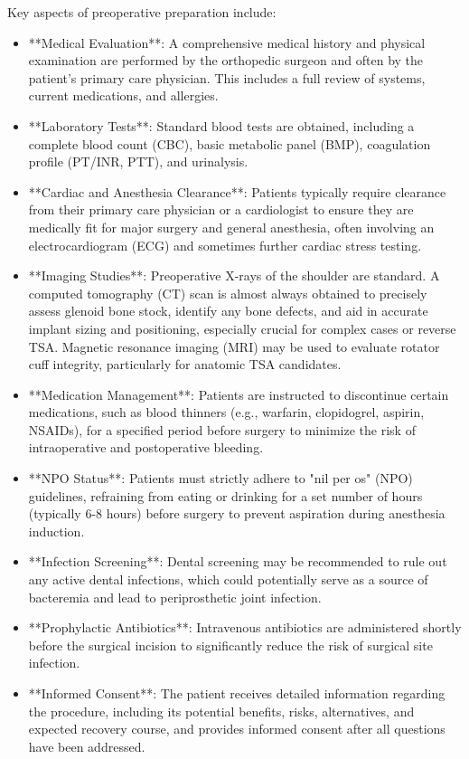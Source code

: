 Key aspects of preoperative preparation include:
\begin{itemize}
  \item **Medical Evaluation**: A comprehensive medical history and physical examination are performed by the orthopedic surgeon and often by the patient's primary care physician. This includes a full review of systems, current medications, and allergies.
  \item **Laboratory Tests**: Standard blood tests are obtained, including a complete blood count (CBC), basic metabolic panel (BMP), coagulation profile (PT/INR, PTT), and urinalysis.
  \item **Cardiac and Anesthesia Clearance**: Patients typically require clearance from their primary care physician or a cardiologist to ensure they are medically fit for major surgery and general anesthesia, often involving an electrocardiogram (ECG) and sometimes further cardiac stress testing.
  \item **Imaging Studies**: Preoperative X-rays of the shoulder are standard. A computed tomography (CT) scan is almost always obtained to precisely assess glenoid bone stock, identify any bone defects, and aid in accurate implant sizing and positioning, especially crucial for complex cases or reverse TSA. Magnetic resonance imaging (MRI) may be used to evaluate rotator cuff integrity, particularly for anatomic TSA candidates.
  \item **Medication Management**: Patients are instructed to discontinue certain medications, such as blood thinners (e.g., warfarin, clopidogrel, aspirin, NSAIDs), for a specified period before surgery to minimize the risk of intraoperative and postoperative bleeding.
  \item **NPO Status**: Patients must strictly adhere to "nil per os" (NPO) guidelines, refraining from eating or drinking for a set number of hours (typically 6-8 hours) before surgery to prevent aspiration during anesthesia induction.
  \item **Infection Screening**: Dental screening may be recommended to rule out any active dental infections, which could potentially serve as a source of bacteremia and lead to periprosthetic joint infection.
  \item **Prophylactic Antibiotics**: Intravenous antibiotics are administered shortly before the surgical incision to significantly reduce the risk of surgical site infection.
  \item **Informed Consent**: The patient receives detailed information regarding the procedure, including its potential benefits, risks, alternatives, and expected recovery course, and provides informed consent after all questions have been addressed.
\end{itemize}

